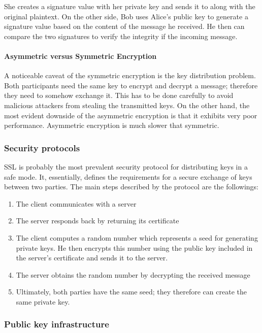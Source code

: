 She creates a signature value with her private key and sends it to along with the original plaintext. On the other side, Bob uses Alice's public key to generate a signature value based on the content of the message he received. He then can compare the two signatures to verify the integrity if the incoming message.

\paragraph{Asymmetric versus Symmetric Encryption}

A noticeable caveat of the symmetric encryption is the key distribution problem. Both participants need the same key to encrypt and decrypt a message; therefore they need to somehow exchange it. This has to be done carefully to avoid malicious attackers from stealing the transmitted keys. On the other hand, the most evident downside of the asymmetric encryption is that it exhibits very poor performance. Asymmetric encryption is much slower that symmetric.

\subsubsection{Security protocols}

SSL is probably the most prevalent security protocol for distributing keys in a safe mode. It, essentially, defines the requirements for a secure exchange of keys between two parties. The main steps described by the protocol are the followings:

\begin{enumerate}
  \item
        The client communicates with a server
  \item
        The server responds back by returning its certificate
  \item
        The client computes a random number which represents a seed for generating private keys. He then encrypts this number using the public key included in the server's certificate and sends it to the server.
  \item
        The server obtains the random number by decrypting the received message
  \item
        Ultimately, both parties have the same seed; they therefore can create the same private key.
\end{enumerate}

\subsubsection{Public key infrastructure}


